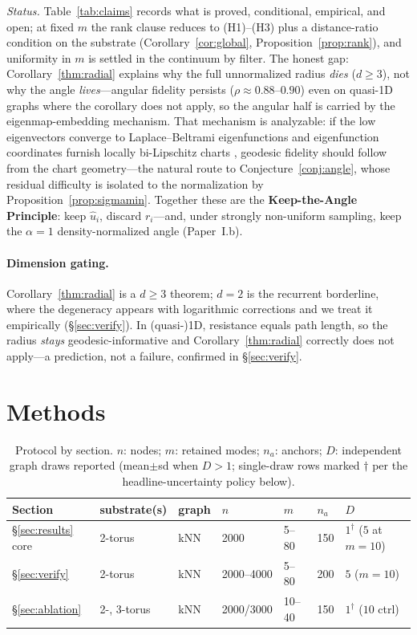 \documentclass[11pt]{article}
\theoremstyle{remark}
\begin{document}
\noindent\emph{Status.} Table~\ref{tab:claims} records what is proved,
conditional, empirical, and open; at fixed $m$ the rank clause reduces to
(H1)--(H3) plus a distance-ratio condition on the substrate
(Corollary~\ref{cor:global}, Proposition~\ref{prop:rank}), and uniformity in
$m$ is settled in the continuum by filter. The honest gap:
Corollary~\ref{thm:radial} explains why the full unnormalized radius
\emph{dies} ($d\ge3$), not why the angle \emph{lives}---angular fidelity
persists ($\rho\approx0.88$--$0.90$) even on quasi-1D graphs where the
corollary does not apply, so the angular half is carried by the
eigenmap-embedding mechanism. That mechanism is analyzable: if the low
eigenvectors converge to Laplace--Beltrami eigenfunctions
\cite{belkin2007,garciatrillos2018} and eigenfunction coordinates furnish
locally bi-Lipschitz charts \cite{jones2010}, geodesic fidelity should follow
from the chart geometry---the natural route to Conjecture~\ref{conj:angle}, whose
residual difficulty is isolated to the normalization by
Proposition~\ref{prop:sigmamin}. Together these are the
\textbf{Keep-the-Angle Principle}: keep $\hat u_i$, discard $r_i$---and, under
strongly non-uniform sampling, keep the $\alpha{=}1$ density-normalized angle
(Paper~I.b).

\paragraph{Dimension gating.} Corollary~\ref{thm:radial} is a $d\ge3$
theorem; $d=2$ is the recurrent borderline, where the degeneracy appears with
logarithmic corrections and we treat it empirically (\S\ref{sec:verify}).
In (quasi-)1D, resistance equals path length, so the radius \emph{stays}
geodesic-informative and Corollary~\ref{thm:radial} correctly does not apply---a
prediction, not a failure, confirmed in \S\ref{sec:verify}.

\section{Methods}\label{sec:methods}
\begin{table}[h]\footnotesize\centering
\caption{Protocol by section. $n$: nodes; $m$: retained modes; $n_a$: anchors;
$D$: independent graph draws reported (mean$\pm$sd when $D>1$; single-draw rows
marked $\dagger$ per the headline-uncertainty policy below).}
\label{tab:protocol}
\begin{tabular}{@{}lllllll@{}}
\toprule
Section & substrate(s) & graph & $n$ & $m$ & $n_a$ & $D$ \\
\midrule
\S\ref{sec:results} core & 2-torus & kNN & 2000 & 5--80 & 150 & $1^{\dagger}$ ($5$ at $m{=}10$) \\
\S\ref{sec:verify} & 2-torus & kNN & 2000--4000 & 5--80 & 200 & $5$ ($m{=}10$) \\
\S\ref{sec:ablation} & 2-, 3-torus & kNN & 2000/3000 & 10--40 & 150 & $1^{\dagger}$ ($10$ ctrl) \\
\bottomrule
\end{tabular}
\end{table}
\end{document}
